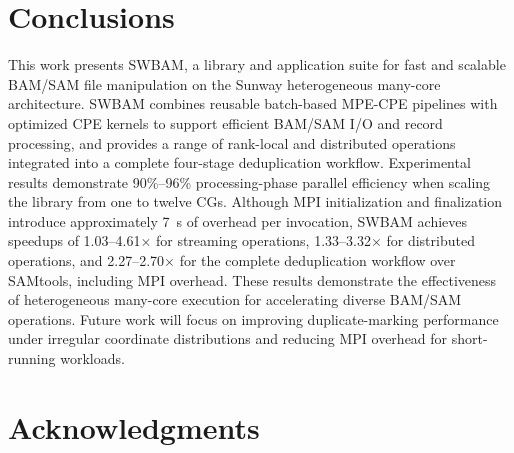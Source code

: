 \documentclass[lettersize,journal]{IEEEtran}
\begin{document}
\section{Conclusions}
This work presents SWBAM, a library and application suite for fast and scalable BAM/SAM file manipulation on the Sunway heterogeneous many-core architecture. 
SWBAM combines reusable batch-based MPE-CPE pipelines with optimized CPE kernels to support efficient BAM/SAM I/O and record processing, and provides a range of rank-local and distributed operations integrated into a complete four-stage deduplication workflow.
Experimental results demonstrate 90\%--96\% processing-phase parallel efficiency when scaling the library from one to twelve CGs. 
Although MPI initialization and finalization introduce approximately 7~s of overhead per invocation, SWBAM achieves speedups of 1.03--4.61$\times$ for streaming operations, 1.33--3.32$\times$ for distributed operations, and 2.27--2.70$\times$ for the complete deduplication workflow over SAMtools, including MPI overhead. 
These results demonstrate the effectiveness of heterogeneous many-core execution for accelerating diverse BAM/SAM operations. 
Future work will focus on improving duplicate-marking performance under irregular coordinate distributions and reducing MPI overhead for short-running workloads.

\section*{Acknowledgments}




\end{document}
